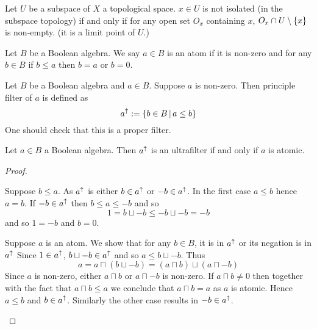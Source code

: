 \begin{ex}
    Let $U$ be a subspace of $X$ a topological space.
    $x \in U$ is not isolated (in the subspace topology) if and only if 
    for any open set $O_x$ containing $x$, 
    $O_x \cap U \setminus \left\{x\right\}$ is non-empty. 
    (it is a limit point of $U$.)
\end{ex}

\begin{dfn}[Atom]
    Let $B$ be a Boolean algebra. 
    We say $a \in B$ is an atom if it is non-zero and for any $b \in B$
    if $b \leq a$ then $b = a$ or $b = 0$.
\end{dfn}

\begin{dfn}
    Let $B$ be a Boolean algebra and $a \in B$.
    Suppose $a$ is non-zero.
    Then principle filter of $a$ is defined as 
    \[a^{\uparrow} := \left\{b \in B \,|\, a \leq b\right\}\]
    One should check that this is a proper filter.
\end{dfn}

\begin{prop}
    Let $a \in B$ a Boolean algebra.
    Then $a^{\uparrow}$ is an ultrafilter if and only if $a$ is atomic. 
\end{prop}
\begin{proof}
    \begin{forward}
        Suppose $b \leq a$.
        As $a^{\uparrow}$ is  
        either $b \in a^{\uparrow}$ or $- b \in a^{\uparrow}$.
        In the first case $a \leq b$ hence $a = b$.
        If $- b \in a^{\uparrow}$ then $b \leq a \leq - b$ and so 
        \[1 = b \sqcup - b \leq - b \sqcup - b = - b\]
        and so $1 = - b$ and $b = 0$.
    \end{forward}

    \begin{backward}
        Suppose $a$ is an atom. 
        We show that for any $b \in B$, 
        it is in $a^{\uparrow}$ or its negation is in $a^{\uparrow}$
        Since $1 \in a^{\uparrow}$, 
        $b \sqcup - b \in a^{\uparrow}$ and so $a \leq b \sqcup - b$.
        Thus
        \[a = a \sqcap (b \sqcup - b) = (a \sqcap b) \sqcup (a \sqcap - b)\]
        Since $a$ is non-zero, either $a \sqcap b$ or $a \sqcap - b$ is non-zero.
        If $a \sqcap b \ne 0$ then together with the fact that $a \sqcap b \leq a$
        we conclude that $a \sqcap b = a$ as $a$ is atomic.
        Hence $a \leq b$ and $b \in a^{\uparrow}$.
        Similarly the other case results in $- b \in a^{\uparrow}$.
    \end{backward}
\end{proof}


